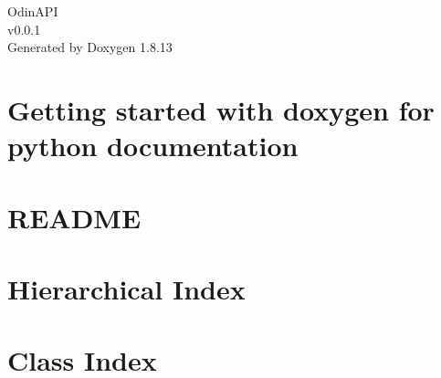 \documentclass[twoside]{book}
\newcommand{\+}{\discretionary{\mbox{\scriptsize$\hookleftarrow$}}{}{}}
\newcommand{\clearemptydoublepage}{%
  \newpage{\pagestyle{empty}\cleardoublepage}%
}
\begin{document}
\hypersetup{pageanchor=false,
             bookmarksnumbered=true,
             pdfencoding=unicode
            }
\begin{titlepage}
\vspace*{7cm}
\begin{center}%
{\Large Odin\+A\+PI \\[1ex]\large v0.\+0.\+1 }\\
\vspace*{1cm}
{\large Generated by Doxygen 1.8.13}\\
\end{center}
\end{titlepage}
\clearemptydoublepage
{}
\tableofcontents
\clearemptydoublepage
{}
\hypersetup{pageanchor=true}

\chapter{Getting started with doxygen for python documentation}
\label{md_docs__r_e_a_d_m_e}

\chapter{R\+E\+A\+D\+ME}
\label{md__r_e_a_d_m_e}

\chapter{Hierarchical Index}

\chapter{Class Index}

\end{document}
